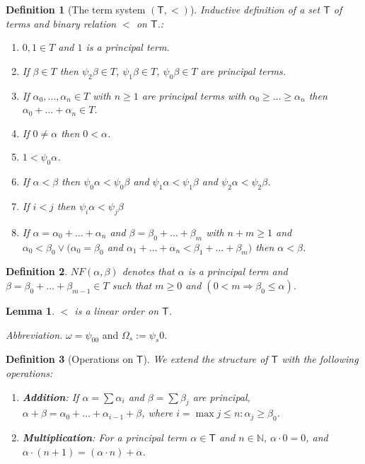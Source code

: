 \documentclass{amsart}
\theoremstyle{plain}
\theoremstyle{plain}
\newtheorem{lemma}[theorem]{Lemma}
\newtheorem*{definition}{Definition}
\newcommand\T{\mathsf{T}}
\newcommand{\Om}{{\Omega}}
\newcommand{\al}{{\alpha}}
\newcommand{\be}{{\beta}}
\newcommand{\om}{\omega}
\begin{document}
\begin{definition}[The term system $(\T,<)$] Inductive definition of a set $\T$ of terms and binary relation $<$ on $\T$.:    \begin{enumerate} 
        \item $0,1 \in T$ and $1$ is a principal term.
        \item If $\be \in T$  then $\psi_2\be \in T$, $\psi_1\be \in T$, $\psi_0\be \in T$ are principal terms.
        \item If $\al_0,\ldots ,\al_n \in T$  with $ n \geq 1 $ are principal terms with $\al_0 \geq \ldots   \geq \al_n $ then $\al_0 +\ldots + \al_n \in T$.
        \item If $0 \neq \al$ then $0<\al$.
        \item $1<\psi_0\al$.
        \item If $\al<\be$ then $\psi_0\al<\psi_0\be$ and  $\psi_1\al<\psi_1\be$ and $\psi_2\al < \psi_2\be$.
        \item If $i<j$ then $\psi_i\al<\psi_j\be$
        \item If $\al= \al_0+\ldots +\al_n$ and $\be=\be_0+\ldots+\be_m$ with $n+m\geq 1 $ 
        and $\al_0<\be_0 \lor ( \al_0 =\be_0 $ and $ \al_1 +\ldots +\al_n < \be_1 + \ldots + \be_m )$ then $\al<\be$.
    \end{enumerate}
\end{definition}
\begin{definition}
$NF(\al,\be)$ denotes that $ \al$ is a principal term and $\be = \be_0+\ldots+\be_{m-1}\in T$ such that $m\geq 0$ and $(0<m \Rightarrow \be_0\leq\al)$.
\end{definition}

\begin{lemma}
	$<$ is a linear order on $\T$.
\end{lemma}

{\em Abbreviation.} $\om=\psi_00$ and $\Om_s :=\psi_s0$.

\begin{definition}[Operations on $\T$]
We extend the structure of $\T$ with the following operations:
\begin{enumerate}
\item \textbf{Addition}: 
If $\alpha = \sum \alpha_i$ and $\beta = \sum \beta_j$ are principal, $\alpha + \beta = \alpha_0 + \dots + \alpha_{i-1} + \beta$, where $i = \max{j \le n : \alpha_j \ge \beta_0}$.

\item \textbf{Multiplication}: For a principal term $\alpha \in \T$ and $n \in \mathbb{N}$, $\alpha \cdot 0 = 0$, and $\alpha \cdot (n+1) = (\alpha \cdot n) + \alpha$.
\end{enumerate}
\end{definition}
\end{document}
